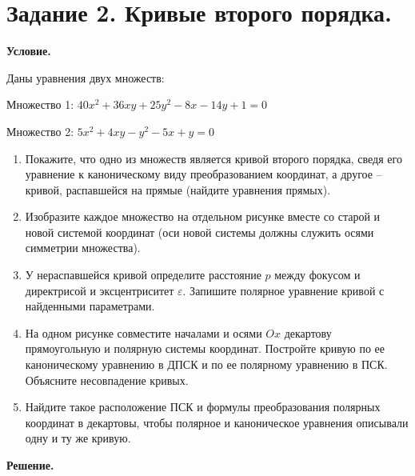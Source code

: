\section{Задание 2. Кривые второго порядка.}

\textbf{Условие.}

Даны уравнения двух множеств:

Множество 1: $40x^2 + 36xy + 25y^2 - 8x - 14y + 1 = 0$

Множество 2: $5x^2 + 4xy - y^2 - 5x + y = 0$

\begin{enumerate}
    \item Покажите, что одно из множеств является кривой второго порядка, сведя его
уравнение к каноническому виду преобразованием координат, а другое – кривой,
распавшейся на прямые (найдите уравнения прямых).
    \item Изобразите каждое множество на отдельном рисунке вместе со старой и новой
системой координат (оси новой системы должны служить осями симметрии
множества).
    \item У нераспавшейся кривой определите расстояние $p$ между фокусом и директрисой и
эксцентриситет $\varepsilon$. Запишите полярное уравнение кривой с найденными параметрами.
    \item На одном рисунке совместите началами и осями $Ox$ декартову прямоугольную и
полярную системы координат. Постройте кривую по ее каноническому уравнению в
ДПСК и по ее полярному уравнению в ПСК. Объясните несовпадение кривых.
    \item Найдите такое расположение ПСК и формулы преобразования полярных координат в
декартовы, чтобы полярное и каноническое уравнения описывали одну и ту же
кривую.
\end{enumerate}
\vspace{10mm}
\textbf{Решение.}
